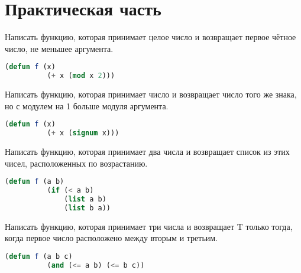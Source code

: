 \documentclass[a4paper,oneside,12pt]{extreport}
\begin{document}


\section*{Практическая часть}

\begin{task}
	Написать функцию, которая принимает целое число и возвращает первое чётное число, не меньшее аргумента.

	\begin{lstlisting}[language=Lisp, gobble=16]
		(defun f (x)
		  (+ x (mod x 2)))
	\end{lstlisting}
\end{task}

\begin{task}
	Написать функцию, которая принимает число и возвращает число того же знака, но с модулем на 1 больше модуля аргумента.

	\begin{lstlisting}[language=Lisp, gobble=16]
		(defun f (x)
		  (+ x (signum x)))
	\end{lstlisting}
\end{task}

\begin{task}
	Написать функцию, которая принимает два числа и возвращает список из этих чисел, расположенных по возрастанию.

	\begin{lstlisting}[language=Lisp, gobble=16]
		(defun f (a b)
		  (if (< a b)
		      (list a b)
		      (list b a))
	\end{lstlisting}
\end{task}

\begin{task}
	Написать функцию, которая принимает три числа и возвращает T только тогда, когда первое число расположено между вторым и третьим.

	\begin{lstlisting}[language=Lisp, gobble=16]
		(defun f (a b c)
		  (and (<= a b) (<= b c))
	\end{lstlisting}
\end{task}
\end{document}
